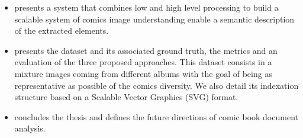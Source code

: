 \begin{itemize}


\item {} presents a system that combines low and high level processing to build a scalable system of comics image understanding enable a semantic description of the extracted elements.


\item {} presents the dataset and its associated ground truth, the metrics and an evaluation of the three proposed approaches.
This dataset consists in a mixture images coming from different albums with the goal of being as representative as possible of the comics diversity.
We also detail its indexation structure based on a Scalable Vector Graphics (SVG) format.

\item {} concludes the thesis and defines the future directions of comic book document analysis.

\end{itemize}

